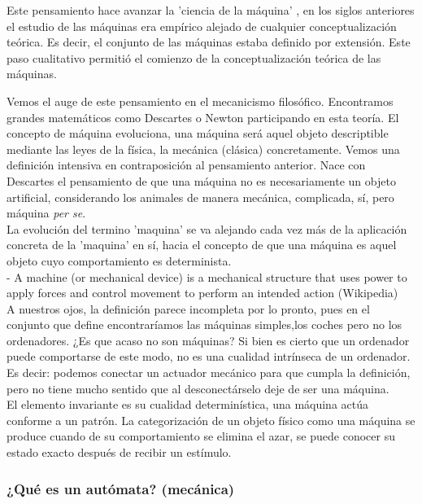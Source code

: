 Este pensamiento hace avanzar la 'ciencia de la máquina' , en los siglos anteriores el estudio de las máquinas era empírico alejado de cualquier conceptualización teórica. Es decir, el conjunto de las máquinas estaba definido por extensión. Este paso cualitativo permitió el comienzo de la conceptualización teórica de las máquinas.

Vemos el auge de este pensamiento en el mecanicismo filosófico. Encontramos grandes matemáticos como Descartes o Newton participando en esta teoría. El concepto de máquina evoluciona, una máquina será aquel objeto descriptible mediante las leyes de la física, la mecánica (clásica) concretamente. Vemos una definición intensiva en contraposición al pensamiento anterior. Nace con Descartes el pensamiento de que una máquina no es necesariamente un objeto artificial, considerando los animales de manera mecánica, complicada, sí, pero máquina \textit{per se}. \\

La evolución del termino 'maquina' se va alejando cada vez más de la aplicación concreta de la 'maquina' en sí, hacia el concepto de que una máquina es aquel objeto cuyo comportamiento es determinista. \\

- A machine (or mechanical device) is a mechanical structure that uses power to apply forces and control movement to perform an intended action (Wikipedia) \\

A nuestros ojos, la definición parece incompleta por lo pronto, pues en el conjunto que define encontraríamos las máquinas simples,los coches pero no los ordenadores. ¿Es que acaso no son máquinas? Si bien es cierto que un ordenador puede comportarse de este modo, no es una cualidad intrínseca de un ordenador. Es decir: podemos conectar un actuador mecánico para que cumpla la definición, pero no tiene mucho sentido que al desconectárselo deje de ser una máquina. \\

El elemento invariante es su cualidad determinística, una máquina actúa conforme a un patrón. La categorización de un objeto físico como una máquina se produce cuando de su comportamiento se elimina el azar, se puede conocer su estado exacto después de recibir un estímulo.



\subsubsection{ ¿Qué es un autómata? (mecánica)}

